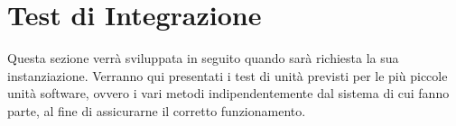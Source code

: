 \documentclass[PianoDiQualifica.tex]{subfiles}
\begin{document}
\chapter{Test di Integrazione}
Questa sezione verrà sviluppata in seguito quando sarà richiesta la sua instanziazione.
Verranno qui presentati i test di unità previsti per le più piccole unità software, ovvero i vari metodi indipendentemente dal sistema di cui fanno parte, al fine di assicurarne il corretto funzionamento.
\end{document}
